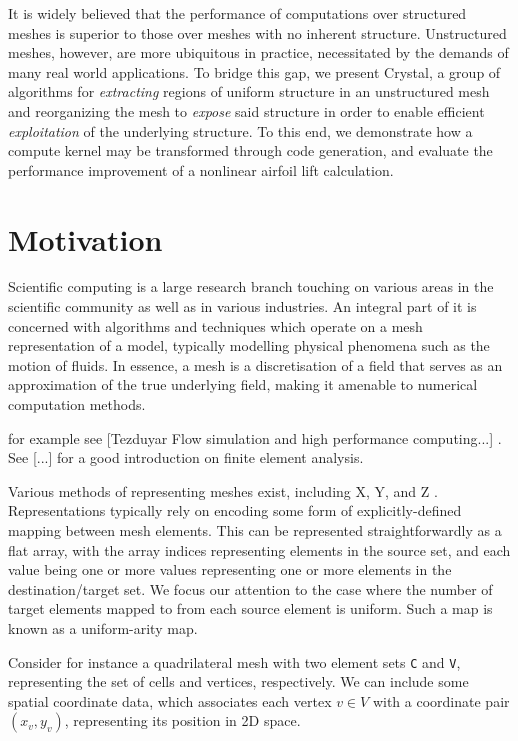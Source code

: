 It is widely believed that the performance of computations over structured meshes is superior to those over meshes with no inherent structure.
Unstructured meshes, however, are more ubiquitous in practice, necessitated by the demands of many real world applications.
To bridge this gap, we present Crystal, a group of algorithms for \emph{extracting} regions of uniform structure in an unstructured mesh and reorganizing the mesh to \emph{expose} said structure in order to enable efficient \emph{exploitation} of the underlying structure.
To this end, we demonstrate how a compute kernel may be transformed through code generation, and evaluate the performance improvement  of a nonlinear airfoil lift calculation.



\section{Motivation}
Scientific computing is a large research branch touching on various areas in the scientific community as well as in various industries. An integral part of it is concerned with algorithms and techniques which operate on a mesh representation of a model, typically modelling physical phenomena such as the motion of fluids. In essence, a mesh is a discretisation of a field that serves as an approximation of the true underlying field, making it amenable to numerical computation methods.

 for example see [Tezduyar Flow simulation and high performance computing...]
. See [...]
for a good introduction on finite element analysis.


Various methods of representing meshes exist, including X, Y, and Z
. Representations typically rely on encoding some form of explicitly-defined mapping between mesh elements. This can be represented straightforwardly as a flat array, with the array indices representing elements in the source set, and each value being one or more values representing one or more elements in the destination/target set. We focus our attention to the case where the number of target elements mapped to from each source element is uniform. Such a map is known as a uniform-arity map.

Consider for instance a quadrilateral mesh with two element sets \texttt{C} and \texttt{V}, representing the set of cells and vertices, respectively.
We can include some spatial coordinate data, which associates each vertex $v \in V$ with a coordinate pair $(x_v, y_v)$, representing its position in 2D space.

